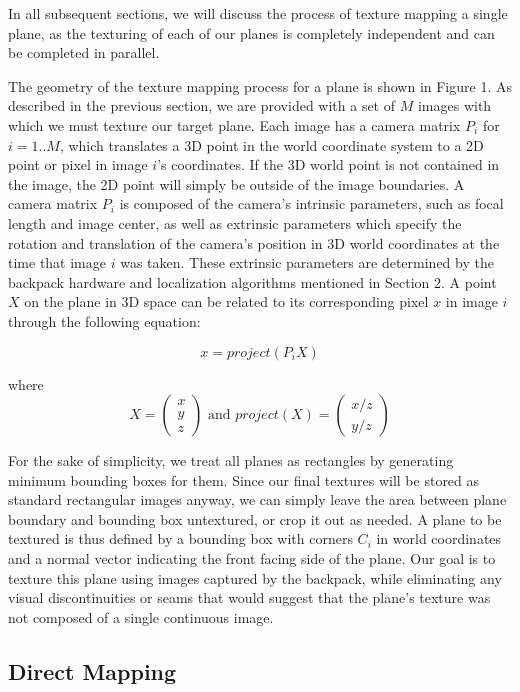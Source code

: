 \documentclass[10pt,twocolumn,letterpaper]{article}
\begin{document}
In all subsequent sections, we will discuss the process of texture
mapping a single plane, as the texturing of each of our planes is
completely independent and can be completed in parallel. 

The geometry of the texture mapping process for a plane is shown in
Figure 1.  As described in the previous section, we are provided with
a set of $M$ images with which we must texture our target plane. Each
image has a camera matrix $P_i$ for $i=1..M$, which translates a 3D
point in the world coordinate system to a 2D point or pixel in image
$i$'s coordinates. If the 3D world point is not contained in the image, the 2D
point will simply be outside of the image boundaries. A camera matrix
$P_i$ is composed of the camera's intrinsic parameters, such as focal
length and image center, as well as extrinsic parameters which specify
the rotation and translation of the camera's position in 3D world coordinates at the time that image $i$ was taken. These
extrinsic parameters are determined by the backpack hardware and
localization algorithms mentioned in Section 2. A point $X$ on the
plane in 3D space can be related to its corresponding pixel $x$ in
image $i$ through the following equation:

\[
x=project(P_iX)
\]

where
\[X = \begin{pmatrix} x \\ y \\ z \end{pmatrix} \textrm{ and }
project(X) = \begin{pmatrix} x/z \\ y/z \end{pmatrix}
\]

For the sake of simplicity, we treat all planes as rectangles by
generating minimum bounding boxes for them. Since our final textures will be
stored as standard rectangular images anyway, we can simply leave the
area between plane boundary and bounding box untextured, or crop it
out as needed. A plane to be textured is thus defined by a bounding
box with corners $C_i$ in world coordinates and a normal vector
indicating the front facing side of the plane. Our goal is to texture
this plane using images captured by the backpack, while eliminating
any visual discontinuities or seams that would suggest that the
plane's texture was not composed of a single continuous image.



\subsection{Direct Mapping}
\end{document}
